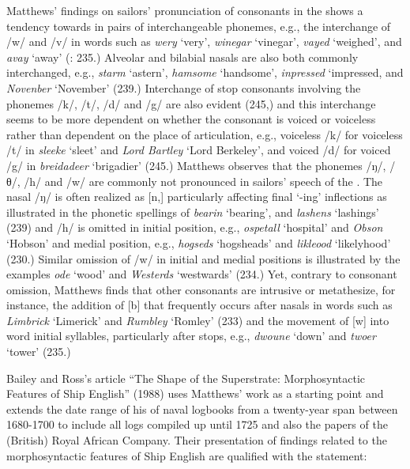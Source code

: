 Matthews’ findings on sailors’ pronunciation of consonants in the  shows a tendency towards  in pairs of interchangeable phonemes, e.g., the interchange of /w/ and /v/ in words such as \textit{wery} ‘very’, \textit{winegar} ‘vinegar’, \textit{vayed} ‘weighed’, and \textit{avay} ‘away’ (\citealt{Matthews1935}: 235.) Alveolar and bilabial nasals are also both commonly interchanged, e.g., \textit{starm} ‘astern’, \textit{hamsome} ‘handsome’, \textit{inpressed} ‘impressed, and \textit{Novenber} ‘November’ (239.) Interchange of stop consonants involving the phonemes /k/, /t/, /d/ and /g/ are also evident (245,) and this interchange seems to be more dependent on whether the consonant is voiced or voiceless rather than dependent on the place of articulation, e.g., voiceless /k/ for voiceless /t/ in \textit{sleeke} ‘sleet’ and \textit{Lord Bartley} ‘Lord Berkeley’, and voiced /d/ for voiced /g/ in \textit{breidadeer} ‘brigadier’ (245.) Matthews observes that the phonemes /ŋ/, /θ/, /h/ and /w/ are commonly not pronounced in sailors’ speech of the . The nasal /ŋ/ is often realized as [n,] particularly affecting final ‘-ing’ inflections as illustrated in the phonetic spellings of \textit{bearin} ‘bearing’, and \textit{lashens} ‘lashings’ (239) and /h/ is omitted in initial position, e.g., \textit{ospetall} ‘hospital’ and \textit{Obson} ‘Hobson’ and medial position, e.g., \textit{hogseds} ‘hogsheads’ and \textit{likleood} ‘likelyhood’ (230.) Similar omission of /w/ in initial and medial positions is illustrated by the examples \textit{ode} ‘wood’ and \textit{Westerds} ‘westwards’ (234.) Yet, contrary to consonant omission, Matthews finds that other consonants are intrusive or metathesize, for instance, the addition of [b] that frequently occurs after nasals in words such as \textit{Limbrick} ‘Limerick’ and \textit{Rumbley} ‘Romley’ (233) and the movement of [w] into word initial syllables, particularly after stops, e.g., \textit{dwoune} ‘down’ and \textit{twoer} ‘tower’ (235.)

Bailey and Ross’s article “The Shape of the Superstrate: Morphosyntactic Features of Ship English” (1988) uses Matthews’ work as a starting point and extends the date range of his  of naval logbooks from a twenty-year span between 1680-1700 to include all logs compiled up until 1725 and also the papers of the (British) Royal African Company. Their presentation of findings related to the morphosyntactic features of Ship English are qualified with the statement:

